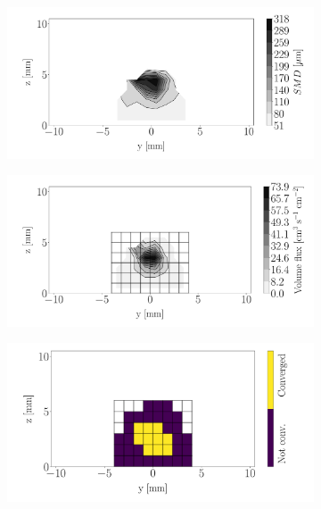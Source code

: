 \begin{figure}[h!]
\centering
\begin{subfigure}[b]{0.3\textwidth}
	\centering
   \includegraphics[scale=\scaleSLIJICF]{./part2_developments/figures_ch5_resolved_JICF/injectors_SLI/uG100_dx20_x05_SMD_map}
\end{subfigure}
   \hspace{0.17in}
\begin{subfigure}[b]{0.3\textwidth}
	\centering
   \includegraphics[scale=\scaleSLIJICF]{./part2_developments/figures_ch5_resolved_JICF/injectors_SLI/uG100_dx20_x05_volume_flux_map}
\end{subfigure}
   \hspace{0.17in}
\begin{subfigure}[b]{0.3\textwidth}
	\centering
   \includegraphics[scale=\scaleSLIJICF]{./part2_developments/figures_ch5_resolved_JICF/injectors_SLI/uG100_dx20_x05_convergence_map}
\end{subfigure}


\end{figure}
